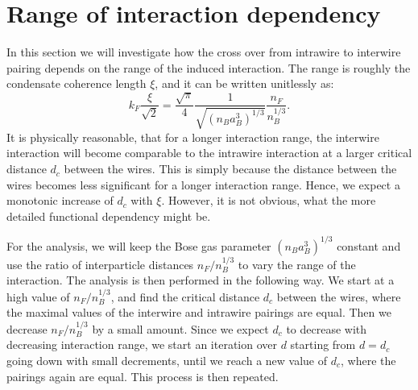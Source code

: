 \section{Range of interaction dependency}
In this section we will investigate how the cross over from intrawire to interwire pairing depends on the range of the induced interaction. The range is roughly the condensate coherence length $\xi$, and it can be written unitlessly as:
\begin{equation}
k_F\frac{\xi}{\sqrt{2}} = \frac{\sqrt{\pi}}{4}\frac{1}{\sqrt{(n_Ba_B^3)^{1/3}}}\frac{n_F}{n_B^{1/3}}.
\end{equation}
It is physically reasonable, that for a longer interaction range, the interwire interaction will become comparable to the intrawire interaction at a larger critical distance $d_c$ between the wires. This is simply because the distance between the wires becomes less significant for a longer interaction range. Hence, we expect a monotonic increase of $d_c$ with $\xi$. However, it is not obvious, what the more detailed functional dependency might be.  

For the analysis, we will keep the Bose gas parameter $(n_Ba_B^3)^{1/3}$ constant and use the ratio of interparticle distances $n_F/n_B^{1/3}$ to vary the range of the interaction. The analysis is then performed in the following way. We start at a high value of $n_F/n_B^{1/3}$, and find the critical distance $d_c$ between the wires, where the maximal values of the interwire and intrawire pairings are equal. Then we decrease $n_F/n_B^{1/3}$ by a small amount. Since we expect $d_c$ to decrease with decreasing interaction range, we start an iteration over $d$ starting from $d = d_c$ going down with small decrements, until we reach a new value of $d_c$, where the pairings again are equal. This process is then repeated.


